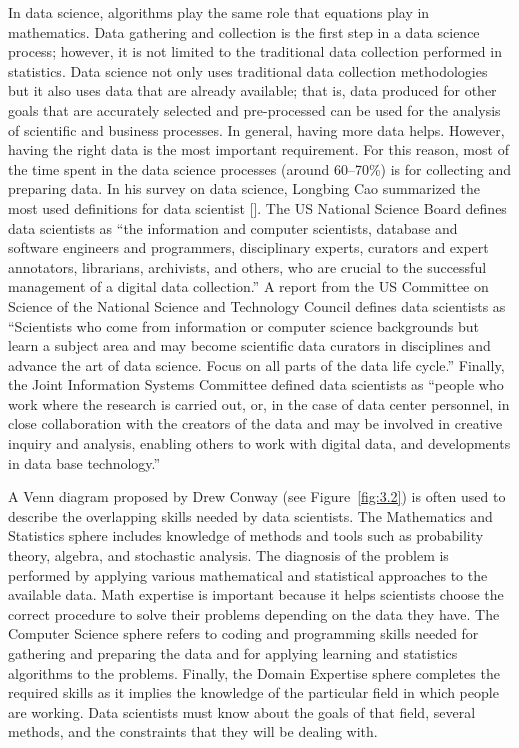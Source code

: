 In data science, algorithms play the same role that equations play in mathematics. Data gathering and collection is the first step in a data science process; however, it is not limited to the traditional data collection performed in statistics. Data science not only uses traditional data collection methodologies but it also uses data that are already available; that is, data produced for other goals that are accurately selected and pre-processed can be used for the analysis of scientific and business processes. In general, having more data helps. However, having the right data is the most important requirement. For this reason, most of the time spent in the data science processes (around 60--70\%) is for collecting and preparing data. In his survey on data science, Longbing Cao summarized the most used definitions for data scientist [\citealt{chap:3:Cao:2017}]. The US National Science Board defines data scientists as ``the information and computer scientists, database and software engineers and programmers, disciplinary experts, curators and expert annotators, librarians, archivists, and others, who are crucial to the successful management of a digital data collection.'' A report from the US Committee on Science of the National \hbox{Science} and Technology Council defines data scientists as ``Scientists who come from information or computer science backgrounds but learn a subject area and may become scientific data curators in disciplines and advance the art of data science. Focus on all parts of the data life cycle.'' Finally, the Joint Information Systems Committee defined data scientists as ``people who work where the research is carried out, or, in the case of data center personnel, in close collaboration with the creators of the data and may be involved in creative inquiry and analysis, enabling others to work with digital data, and developments in data base technology.''

A Venn diagram proposed by Drew Conway (see Figure~\ref{fig:3.2}) is often used to describe the overlapping skills needed by data scientists. The Mathematics and Statistics sphere includes knowledge of methods and tools such as probability theory, algebra, and stochastic analysis. The diagnosis of the problem is performed by applying various mathematical and statistical approaches to the available data. Math expertise is important because it helps scientists choose the correct procedure to solve their problems depending on the data they have. The Computer Science sphere refers to coding and programming skills needed for gathering and preparing the data and for applying learning and statistics algorithms to the problems. Finally, the Domain Expertise sphere completes the required skills as it implies the knowledge of the particular field in which people are working. Data scientists must know about the goals of that field, several methods, and the constraints that they will be dealing with.


